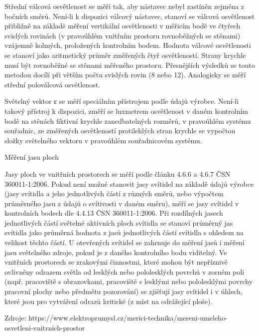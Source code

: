 \medskip
Střední válcová osvětlenost se měří tak, aby nástavec nebyl zastíněn zejména z bočních směrů. Není-li k dispozici válcový nástavec, stanoví se válcová osvětlenost přibližně na základě měření vertikální osvětlenosti v měřicím bodě ve čtyřech svislých rovinách (v pravoúhlém vnitřním prostoru rovnoběžných se stěnami) vzájemně kolmých, proložených kontrolním bodem. Hodnota válcové osvětlenosti se stanoví jako aritmetický průměr změřených čtyř osvětleností. Strany krychle musí být rovnoběžné se stěnami měřeného prostoru. Přesnějších výsledků se touto metodou docílí při větším počtu svislých rovin (8 nebo 12). Analogicky se měří střední poloválcová osvětlenost.

\medskip
Světelný vektor ε se měří speciálním přístrojem podle údajů výrobce. Není-li takový přístroj k dispozici, změří se luxmetrem osvětlenost v daném kontrolním bodě na stěnách fiktivní krychle zanedbatelných rozměrů, v pravoúhlém systému souřadnic, ze změřených osvětleností protilehlých stran krychle se vypočtou složky světelného vektoru v pravoúhlém souřadnicovém systému.

\sec Měření jasu ploch

Jasy ploch ve vnitřních prostorech se měří podle článku 4.6.6 a 4.6.7 ČSN 360011-1:2006. Pokud není možné stanovit jasy svítidel na základě údajů výrobce (jasy svítidla a jeho jednotlivých částí z různých směrů, nebo výpočtem průměrného jasu z údajů o svítivosti v daném směru), měří se jasy svítidel v kontrolních bodech dle 4.4.13 ČSN 360011-1:2006.
\medskip
Při rozdílných jasech jednotlivých částí světelné aktivních ploch svítidla se stanoví průměrný jas svítidla jako průměrná hodnota z jasů jednotlivých částí svítidla s ohledem na velikost těchto částí. U otevřených svítidel se zahrnuje do měření jasů i měření jasu světelného zdroje, pokud je z daného kontrolního bodu viditelný.
\medskip
Ve vnitřních prostorech se zrakovými činnostmi, které mohou být nepříznivě ovlivněny odrazem světla od lesklých nebo pololesklých povrchů v zorném poli (např. pracoviště s obrazovkami, pracoviště s lesklými nebo pololesklými povrchy pracovní plochy nebo předmětu pozorování) se zjišťují jasy svítidel i v úhlech, které jsou pro vytváření odrazů kritické (z míst na odrážející ploše).

\medskip
Zdroje: https://www.elektroprumysl.cz/merici-technika/mereni-umeleho-osvetleni-vnitrnich-prostor